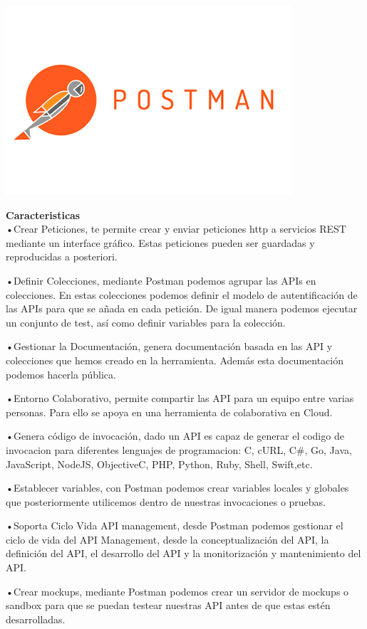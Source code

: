 \documentclass[twocolumn]{article}
\begin{document}
\includegraphics[width=0.8\linewidth]{img/foto4}

\textbf{Caracteristicas}
\\•Crear Peticiones, te permite crear y enviar peticiones http a servicios REST mediante un interface gráfico. Estas peticiones pueden ser guardadas y reproducidas a posteriori.

•Definir Colecciones, mediante Postman podemos agrupar las APIs en colecciones. En estas colecciones podemos definir el modelo de autentificación de las APIs para que se añada en cada petición. De igual manera podemos ejecutar un conjunto de test, así como definir variables para la colección.

•Gestionar la Documentación, genera documentación basada en las API y colecciones que hemos creado en la herramienta. Además esta documentación podemos hacerla pública.

•Entorno Colaborativo, permite compartir las API para un equipo entre varias personas. Para ello se apoya en una herramienta de colaborativa en Cloud.

•Genera código de invocación, dado un API es capaz de generar el codigo de invocacion para diferentes lenguajes de programacion: C, cURL, C\#, Go, Java, JavaScript, NodeJS, Objective\-C, PHP, Python, Ruby, Shell, Swift,etc.

•Establecer variables, con Postman podemos crear variables locales y globales que posteriormente utilicemos dentro de nuestras invocaciones o pruebas.

•Soporta Ciclo Vida API management, desde Postman podemos gestionar el ciclo de vida del API Management, desde la conceptualización del API, la definición del API, el desarrollo del API y la monitorización y mantenimiento del API.

•Crear mockups, mediante Postman podemos crear un servidor de mockups o sandbox para que se puedan testear nuestras API antes de que estas estén desarrolladas.
\end{document}
